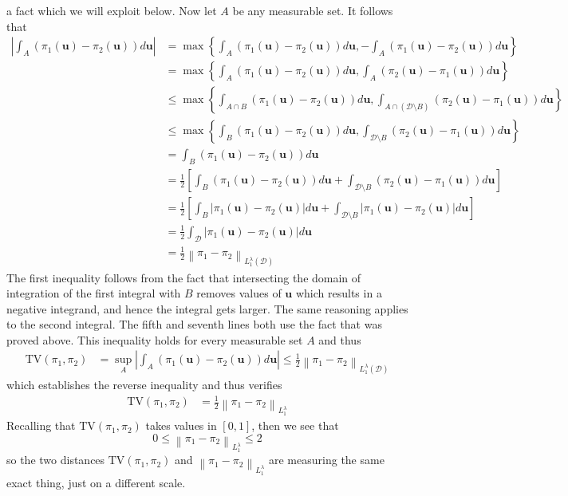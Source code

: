 \documentclass[12pt]{article}
\newcommand{\bpar}{\mathbf{u}} %
\newcommand*{\norm}[1]{\left\lVert#1\right\rVert}
\newcommand*{\abs}[1]{\left\lvert#1\right\rvert}
\begin{document}
a fact which we will exploit below. Now let $A$ be any measurable set. It follows that 
\begin{align*}
\abs{\int_A \left(\pi_1(\bpar) - \pi_2(\bpar)\right) d\bpar} &= \max\left\{\int_A \left(\pi_1(\bpar) - \pi_2(\bpar)\right) d\bpar, -\int_A \left(\pi_1(\bpar) - \pi_2(\bpar)\right) d\bpar \right\} \\
										      &=  \max\left\{\int_A \left(\pi_1(\bpar) - \pi_2(\bpar)\right) d\bpar, \int_A \left(\pi_2(\bpar) - \pi_1(\bpar)\right) d\bpar \right\} \\
										      &\leq \max\left\{\int_{A \cap B} \left(\pi_1(\bpar) - \pi_2(\bpar)\right) d\bpar, \int_{A \cap (\mathcal{D} \setminus B)} \left(\pi_2(\bpar) - \pi_1(\bpar)\right) d\bpar \right\} \\
										      &\leq \max\left\{\int_{B} \left(\pi_1(\bpar) - \pi_2(\bpar)\right) d\bpar, \int_{\mathcal{D} \setminus B} \left(\pi_2(\bpar) - \pi_1(\bpar)\right) d\bpar \right\} \\
										      &= \int_{B} \left(\pi_1(\bpar) - \pi_2(\bpar)\right) d\bpar \\
										      &= \frac{1}{2} \left[\int_{B} \left(\pi_1(\bpar) - \pi_2(\bpar)\right) d\bpar + \int_{\mathcal{D} \setminus B} \left(\pi_2(\bpar) - \pi_1(\bpar) \right) d\bpar \right] \\
										      &= \frac{1}{2} \left[\int_{B} \abs{\pi_1(\bpar) - \pi_2(\bpar)} d\bpar + \int_{\mathcal{D} \setminus B} \abs{\pi_1(\bpar) - \pi_2(\bpar)} d\bpar \right] \\
										      &= \frac{1}{2} \int_{\mathcal{D}} \abs{\pi_1(\bpar) - \pi_2(\bpar)} d\bpar \\
										      &= \frac{1}{2} \norm{\pi_1 - \pi_2}_{L_1^{\lambda}(\mathcal{D})}
\end{align*}
The first inequality follows from the fact that intersecting the domain of integration of the first integral with $B$ removes values of $\bpar$ which results in a negative integrand, and hence the 
integral gets larger. The same reasoning applies to the second integral. The fifth and seventh lines both use the fact that was proved above. This inequality holds for every measurable set $A$ and thus 
\begin{align*}
\text{TV}(\pi_1, \pi_2) &= \sup_A \abs{\int_A \left(\pi_1(\bpar) - \pi_2(\bpar)\right) d\bpar} \leq \frac{1}{2} \norm{\pi_1 - \pi_2}_{L_1^{\lambda}(\mathcal{D})}
\end{align*}
which establishes the reverse inequality and thus verifies 
\begin{align*}
\text{TV}(\pi_1, \pi_2) &= \frac{1}{2} \norm{\pi_1 - \pi_2}_{L_1^\lambda}
\end{align*}
Recalling that $\text{TV}(\pi_1, \pi_2)$ takes values in $[0, 1]$, then we see that 
\[0 \leq \norm{\pi_1 - \pi_2}_{L_1^\lambda} \leq 2\]
so the two distances $\text{TV}(\pi_1, \pi_2)$ and $\norm{\pi_1 - \pi_2}_{L_1^\lambda}$ are measuring the same exact thing, just on a different scale. 
\end{document}
